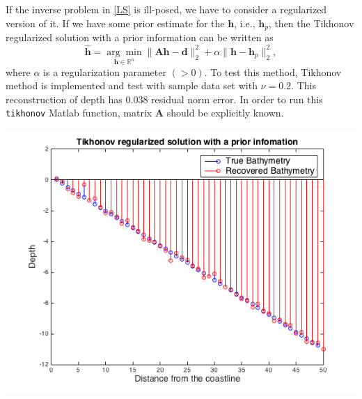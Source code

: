 If the inverse problem in \eqref{LS} is ill-posed, we have to consider a regularized version of it. If we have some prior estimate for the $\mathbf{h}$, i.e., $\mathbf{h}_p$, then the Tikhonov regularized solution with a prior information can be written as
$$
\mathbf{\hat{h}} = \underset{\mathbf{h} \in \mathbb{R}^n}{\arg \min} \|  \mathbf{A}\mathbf{h} -  \mathbf{d} \|_2^2  +  \alpha \| \mathbf{h} -  \mathbf{h}_p\|_2^2,
$$
where $\alpha$ is a regularization parameter $(>0)$. To test this method, Tikhonov method is implemented and test with sample data set with $\nu = 0.2$. This reconstruction of depth has 0.038 residual norm error. In order to run this \verb|tikhonov| Matlab function, matrix $\mathbf{A}$ should be explicitly known.

\begin{center}
\includegraphics[scale=0.6]{img/Tikhnove_reg.png} 
\end{center}









%
%
%
%
%

